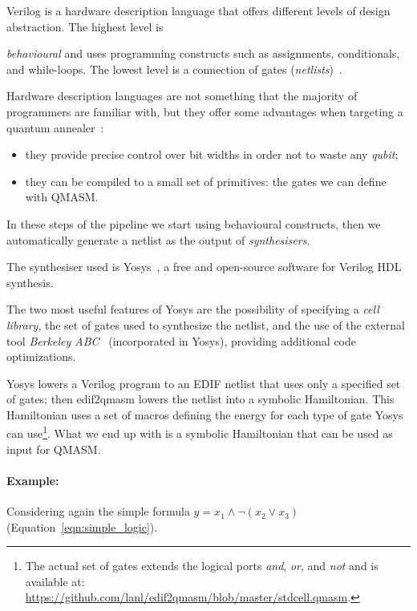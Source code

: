 Verilog is a hardware description language that offers different levels of design abstraction. The highest level is {\emph{behavioural} and uses programming constructs such as assignments, conditionals, and while-loops. The lowest level is a connection of gates (\emph{netlists})~\cite{gordon1995semantic}. 

Hardware description languages are not something that the majority of programmers are familiar with, but they offer some advantages when targeting a quantum annealer~\cite{pakin2019targeting}:
\begin{itemize}
	\item they provide precise control over bit widths in order not to waste any \emph{qubit};
	\item they can be compiled to a small set of primitives: the gates we can define with QMASM.
\end{itemize}

In these steps of the pipeline we start using behavioural constructs, then we automatically generate a netlist as the output of \emph{synthesisers}. 

The synthesiser used is Yosys~\cite{wolf2013yosys}, a free and open-source software for Verilog HDL synthesis.

The two most useful features of Yosys are the possibility of specifying a \emph{cell library}, the set of gates used to synthesize the netlist, and the use of the external tool\emph{ Berkeley ABC}~\cite{brayton2010abc} (incorporated in Yosys), providing additional code optimizations.

Yosys lowers a Verilog program to an EDIF netlist that uses only a specified set of gates; then edif2qmasm lowers the netlist into a symbolic Hamiltonian. This Hamiltonian uses a set of macros defining the energy for each type of gate Yosys can use\footnote{The actual set of gates extends the logical ports \emph{and}, \emph{or}, and \emph{not} and is available at: \url{https://github.com/lanl/edif2qmasm/blob/master/stdcell.qmasm}.}. What we end up with is a symbolic Hamiltonian that can be used as input for QMASM.

\paragraph{Example:}\label{ex:sat_verilog} Considering again the simple formula $y = x_1 \land \neg(x_2\lor x_3)$ (Equation~\ref{eqn:simple_logic}).

}
